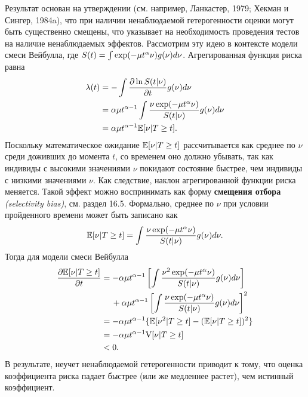 Результат основан на утверждении (см. например, Ланкастер, 1979; Хекман и Сингер, 1984a), что при наличии ненаблюдаемой гетерогенности оценки могут быть существенно смещены, что указывает на необходимость проведения тестов на наличие ненаблюдаемых эффектов. Рассмотрим эту идею в контексте модели смеси Вейбулла, где $S(t) = \int \exp(-\mu t^{\alpha}\nu) g(\nu) d\nu$. Агрегированная функция риска равна
    \begin{align}
        \lambda(t) &= -\int\frac{\partial \ln S(t|\nu)}{\partial t} g(\nu) d\nu \notag\\
               &= \alpha\mu t^{\alpha-1} \int \frac{\nu\exp(-\mu t^{\alpha}\nu)}{S(t|\nu)} g(\nu) d\nu \notag \\
               &= \alpha\mu t^{\alpha-1} \mathbb{E}[\nu|T\ge t]. \notag
    \end{align}
Поскольку математическое ожидание $\mathbb{E}[\nu|T\ge t]$ рассчитывается как среднее по $\nu$ среди доживших до момента $t$, со временем оно должно убывать, так как индивиды с высокими значениями $\nu$ покидают состояние быстрее, чем индивиды с низкими значениями $\nu$. Как следствие, наклон агрегированной функции риска меняется. Такой эффект можно воспринимать как форму \textbf{смещения отбора} \textit{(selectivity bias)}, %
см. раздел 16.5. %
Формально, среднее по $\nu$ при условии пройденного времени может быть записано как
    $$\mathbb{E}[\nu|T\ge t] = \int\frac{\nu\exp(-\mu t^\alpha\nu)}{S(t|\nu)} g(\nu) d\nu.$$
Тогда для модели смеси Вейбулла
    \begin{align}
    \label{eq:18.15}
        \frac{\partial\mathbb{E}[\nu|T\ge t]}{\partial t} &= -\alpha\mu t^{\alpha-1} \left[ \int\frac{\nu^2\exp(-\mu t^\alpha\nu)}{S(t|\nu)} g(\nu) d\nu \right] \notag\\
                                        &\hspace{0.43cm} +\alpha\mu t^{\alpha-1} \left[ \int\frac{\nu\exp(-\mu t^\alpha\nu)}{S(t|\nu)} g(\nu) d\nu \right]^2 \notag \\
                                        &= -\alpha\mu t^{\alpha-1} \{\mathbb{E}[\nu^2|T\ge t] - (\mathbb{E}[\nu|T\ge t])^2 \} \notag\\
                                        &= -\alpha\mu t^{\alpha-1} \mathrm{V}[\nu|T\ge t] \\
                                        &< 0. \notag
    \end{align}
В результате, неучет ненаблюдаемой гетерогенности приводит к тому, что оценка коэффициента риска падает быстрее (или же медленнее растет), чем истинный коэффициент.

